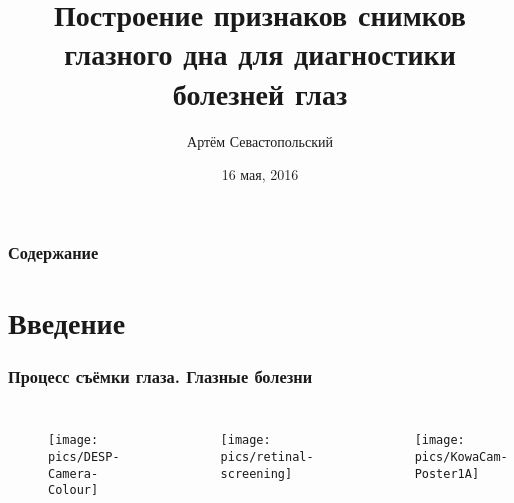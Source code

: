 \documentclass{beamer}
\title[Сегментация глазных снимков]{Построение признаков снимков глазного дна для диагностики болезней глаз} %
\author{Артём Севастопольский} %
\institute[] %
{
ММП ВМК МГУ \\ %
}
\date{16 мая, 2016} %
\begin{document}
\begin{frame}
\titlepage %
\end{frame}

\begin{frame}
\frametitle{Содержание} %
\tableofcontents %
\end{frame}


\section{Введение} %

\begin{frame}
	\frametitle{Процесс съёмки глаза. Глазные болезни}
	
	\begin{columns}[c] %
		
		
		\begin{figure}
		\centering
		\texttt{[image: pics/DESP-Camera-Colour]}
		\label{fig:DESP-Camera-Colour}
		\end{figure}
		
		\begin{figure}
		\centering
		\texttt{[image: pics/retinal-screening]}
		\label{fig:retinal-screening}
		\end{figure}
		
		
		\begin{figure}
		\centering
		\texttt{[image: pics/KowaCam-Poster1A]}
		\label{fig:KowaCam-Poster1A}
		\end{figure}
	
	\end{columns}
	
\end{frame}
\end{document}
